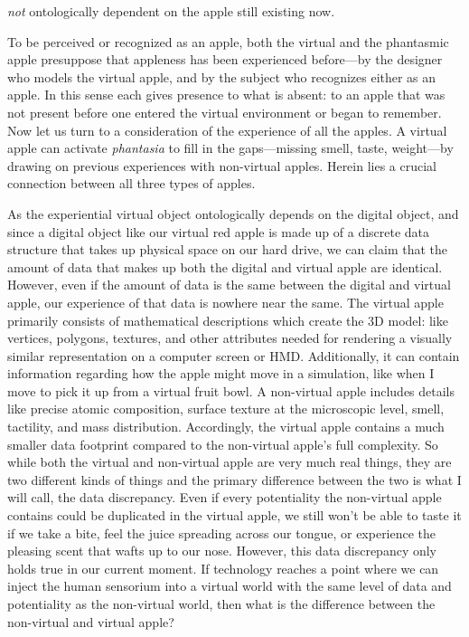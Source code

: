 \documentclass{article}
\begin{document}
\textit{not} ontologically dependent on the apple still existing now.

To be perceived or recognized as an apple, both the virtual and the phantasmic apple presuppose that appleness has been experienced before—by the designer who models the virtual apple, and by the subject who recognizes either as an apple. In this sense each gives presence to what is absent: to an apple that was not present before one entered the virtual environment or began to remember. Now let us turn to a consideration of the experience of all the apples. A virtual apple can activate \textit{phantasia} to fill in the gaps—missing smell, taste, weight—by drawing on previous experiences with non-virtual apples. Herein lies a crucial connection between all three types of apples.

As the experiential virtual object ontologically depends on the digital object, and since a digital object like our virtual red apple is made up of a discrete data structure that takes up physical space on our hard drive, we can claim that the amount of data that makes up both the digital and virtual apple are identical. However, even if the amount of data is the same between the digital and virtual apple, our experience of that data is nowhere near the same. The virtual apple primarily consists of mathematical descriptions which create the 3D model: like vertices, polygons, textures, and other attributes needed for rendering a visually similar representation on a computer screen or HMD. Additionally, it can contain information regarding how the apple might move in a simulation, like when I move to pick it up from a virtual fruit bowl. A non-virtual apple includes details like precise atomic composition, surface texture at the microscopic level, smell, tactility, and mass distribution. Accordingly, the virtual apple contains a much smaller data footprint compared to the non-virtual apple's full complexity. So while both the virtual and non-virtual apple are very much real things, they are two different kinds of things and the primary difference between the two is what I will call, the data discrepancy. Even if every potentiality the non-virtual apple contains could be duplicated in the virtual apple, we still won't be able to taste it if we take a bite, feel the juice spreading across our tongue, or experience the pleasing scent that wafts up to our nose. However, this data discrepancy only holds true in our current moment. If technology reaches a point where we can inject the human sensorium into a virtual world with the same level of data and potentiality as the non-virtual world, then what is the difference between the non-virtual and virtual apple?
\end{document}

